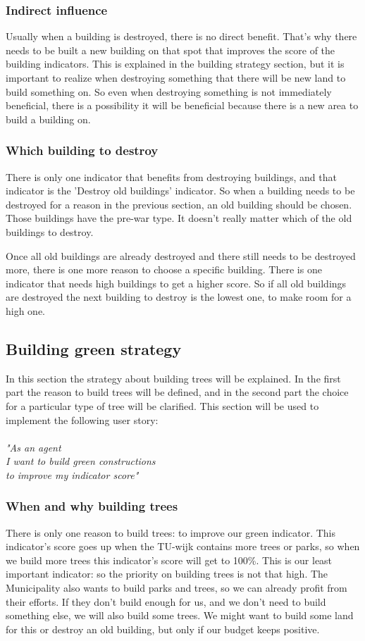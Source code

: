 \subsubsection{Indirect influence}
Usually when a building is destroyed, there is no direct benefit. That's why there needs to be built a new building on that spot that improves the score of the building indicators. This is explained in the building strategy section, but it is important to realize when destroying something that there will be new land to build something on. So even when destroying something is not immediately beneficial, there is a possibility it will be beneficial because there is a new area to build a building on.

\subsubsection{Which building to destroy}
There is only one indicator that benefits from destroying buildings, and that indicator is the 'Destroy old buildings' indicator. So when a building needs to be destroyed for a reason in the previous section, an old building should be chosen. Those buildings have the pre-war type. It doesn't really matter which of the old buildings to destroy. 

Once all old buildings are already destroyed and there still needs to be destroyed more, there is one more reason to choose a specific building. There is one indicator that needs high buildings to get a higher score. So if all old buildings are destroyed the next building to destroy is the lowest one, to make room for a high one.

\subsection{Building green strategy}
In this section the strategy about building trees will be explained. In the first part the reason to build trees will be defined, and in the second part the choice for a particular type of tree will be clarified. This section will be used to implement the following user story:\\
\\
\textit{"As an agent\\
I want to build green constructions\\
to improve my indicator score"}

\subsubsection{When and why building trees}
There is only one reason to build trees: to improve our green indicator. This indicator's score goes up when the TU-wijk contains more trees or parks, so when we build more trees this indicator's score will get to 100\%. This is our least important indicator: so the priority on building trees is not that high. The Municipality also wants to build parks and trees, so we can already profit from their efforts. If they don't build enough for us, and we don't need to build something else, we will also build some trees. We might want to build some land for this or destroy an old building, but only if our budget keeps positive.

